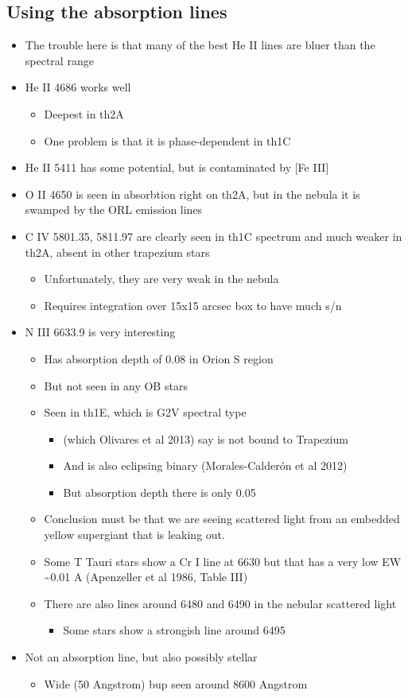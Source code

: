 \documentclass[11pt]{article}
\begin{document}
\subsection{Using the absorption lines}
\label{sec:orgheadline6}
\begin{itemize}
\item The trouble here is that many of the best He II lines are bluer than the spectral range
\item He II 4686 works well
\begin{itemize}
\item Deepest in th2A
\item One problem is that it is phase-dependent in th1C
\end{itemize}
\item He II 5411 has some potential, but is contaminated by [Fe III]
\item O II 4650 is seen in absorbtion right on th2A, but in the nebula it is swamped by the ORL emission lines
\item C IV 5801.35, 5811.97 are clearly seen in th1C spectrum and much weaker in th2A, absent in other trapezium stars
\begin{itemize}
\item Unfortunately, they are very weak in the nebula
\item Requires integration over 15x15 arcsec box to have much s/n
\end{itemize}
\item N III 6633.9 is very interesting
\begin{itemize}
\item Has absorption depth of 0.08 in Orion S region
\item But not seen in any OB stars
\item Seen in th1E, which is G2V spectral type
\begin{itemize}
\item (which Olivares et al 2013) say is not bound to Trapezium
\item And is also eclipsing binary (Morales-Calderón et al 2012)
\item But absorption depth there is only 0.05
\end{itemize}
\item Conclusion must be that we are seeing scattered light from an embedded yellow supergiant that is leaking out.
\item Some T Tauri stars show a Cr I line at 6630 but that has a very low EW \textasciitilde{}0.01 A (Apenzeller et al 1986, Table III)
\item There are also lines around 6480 and 6490 in the nebular scattered light
\begin{itemize}
\item Some stars show a strongish line around 6495
\end{itemize}
\end{itemize}
\item Not an absorption line, but also possibly stellar
\begin{itemize}
\item Wide (50 Angstrom) bup seen around 8600 Angstrom
\end{itemize}
\end{itemize}
\end{document}
